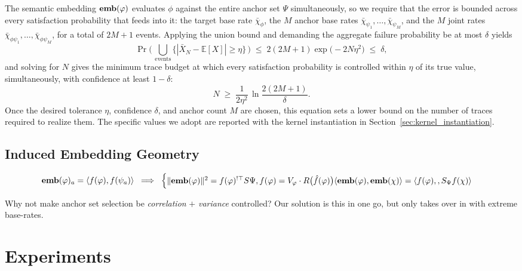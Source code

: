 \documentclass[titlepage,a4paper,11pt]{report}
\begin{document}
    The semantic embedding $\textbf{emb}(\varphi)$ evaluates $\phi$ against the entire anchor set $\Psi$ simultaneously, so we require that the error is bounded across every satisfaction probability that feeds into it: the target base rate $\bar\chi_\phi$, the $M$ anchor base rates $\bar\chi_{\psi_1}, \dots, \bar\chi_{\psi_M}$, and the $M$ joint rates $\bar\chi_{\phi\psi_1}, \dots,\bar\chi_{\phi\psi_M}$, for a total of $2M + 1$ events. Applying the union bound and demanding the aggregate failure probability be at most $\delta$ yields
    \begin{equation}\label{eq:hoeffding_union}
        \Pr\!\bigg(\,\bigcup_{\text{events}}\!\bigl\{|\bar X_N - \mathbb{E}[X]| \ge \eta\bigr\}\,\bigg) \;\le\; 2(2M+1)\exp\!\bigl(-2N\eta^2\bigr) \;\le\; \delta,
    \end{equation}
    and solving for $N$ gives the minimum trace budget at which every satisfaction probability is controlled within $\eta$ of its true value, simultaneously, with confidence at least $1 - \delta$:
    \begin{equation}\label{eq:n_min}
        N \;\ge\; \frac{1}{2\eta^2}\,\ln\!\frac{2(2M+1)}{\delta}.
    \end{equation}
    Once the desired tolerance $\eta$, confidence $\delta$, and anchor count $M$ are chosen, this equation sets a lower bound on the number of traces required to realize them. The specific values we adopt are reported with the kernel instantiation in Section~\ref{sec:kernel_instantiation}.

    \section{Induced Embedding Geometry}\label{sec:embedding_geometry}

    $$\textbf{emb}(\varphi)_a = \langle f(\varphi), f(\psi_a)\rangle \;\;\Longrightarrow\;\;
    \begin{cases}
    \lVert \textbf{emb}(\varphi)\rVert^2 = f(\varphi)^{!\top} S\Psi, f(\varphi) = V_\varphi \cdot R\bigl(\hat f(\varphi)\bigr) 
    \langle \textbf{emb}(\varphi), \textbf{emb}(\chi)\rangle = \langle f(\varphi),, S_\Psi f(\chi)\rangle
    \end{cases}$$

    Why not make anchor set selection be \emph{correlation} $+$ \emph{variance} controlled? Our solution is this in one go, but only takes over in with extreme base-rates. 
    
\chapter{Experiments}\label{chap:experiments}
\end{document}
